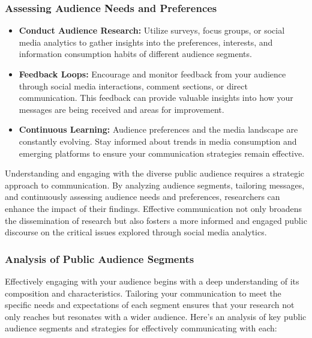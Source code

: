 \documentclass[
]{book}
\providecommand{\tightlist}{%
  \setlength{\itemsep}{0pt}\setlength{\parskip}{0pt}}
\begin{document}
\hypertarget{assessing-audience-needs-and-preferences}{%
\subsubsection*{Assessing Audience Needs and Preferences}\label{assessing-audience-needs-and-preferences}}

\begin{itemize}
\tightlist
\item
  \textbf{Conduct Audience Research:} Utilize surveys, focus groups, or social media analytics to gather insights into the preferences, interests, and information consumption habits of different audience segments.
\item
  \textbf{Feedback Loops:} Encourage and monitor feedback from your audience through social media interactions, comment sections, or direct communication. This feedback can provide valuable insights into how your messages are being received and areas for improvement.
\item
  \textbf{Continuous Learning:} Audience preferences and the media landscape are constantly evolving. Stay informed about trends in media consumption and emerging platforms to ensure your communication strategies remain effective.
\end{itemize}

Understanding and engaging with the diverse public audience requires a strategic approach to communication. By analyzing audience segments, tailoring messages, and continuously assessing audience needs and preferences, researchers can enhance the impact of their findings. Effective communication not only broadens the dissemination of research but also fosters a more informed and engaged public discourse on the critical issues explored through social media analytics.

\hypertarget{analysis-of-public-audience-segments}{%
\subsubsection*{Analysis of Public Audience Segments}\label{analysis-of-public-audience-segments}}

Effectively engaging with your audience begins with a deep understanding of its composition and characteristics. Tailoring your communication to meet the specific needs and expectations of each segment ensures that your research not only reaches but resonates with a wider audience. Here's an analysis of key public audience segments and strategies for effectively communicating with each:
\end{document}
